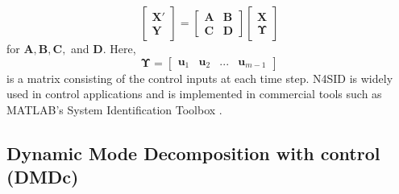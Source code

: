 \documentclass[../main.tex]{subfiles}
\begin{document}
\begin{equation}
    \begin{bmatrix}
        \bm{X}' \\ \bm{Y}
    \end{bmatrix} =
    \begin{bmatrix}
        \bm{A} & \bm{B} \\
        \bm{C} & \bm{D}
    \end{bmatrix}
    \begin{bmatrix}
        \bm{X} \\ \bm{\Upsilon}
    \end{bmatrix}
\end{equation}
for $\bm{A}, \bm{B}, \bm{C},$ and $\bm{D}$. Here,
\begin{equation}
    \label{eq:upsilon}
    \bm{\Upsilon} = \begin{bmatrix}
        \bm{u}_1 & \bm{u}_2 & ... & \bm{u}_{m-1}
    \end{bmatrix}
\end{equation}
is a matrix consisting of the control inputs at each time step. N4SID is widely used in control applications and is implemented in commercial tools such as MATLAB’s System Identification Toolbox \cite{MATLAB_SysID}.

\subsection{Dynamic Mode Decomposition with control (DMDc)}
\label{sec:DMD}
\end{document}
